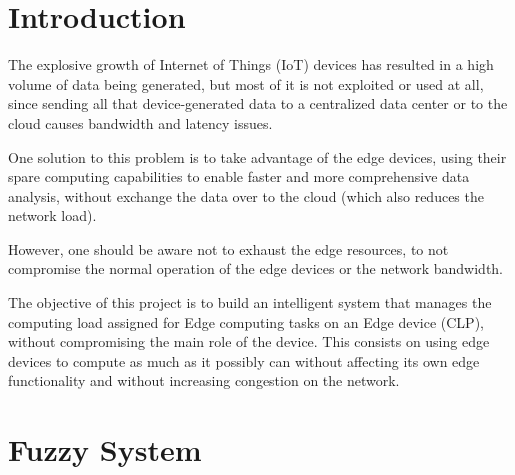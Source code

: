 \documentclass[10pt]{article}
\begin{document}
\maketitle


\section{Introduction}
\normalfont
The explosive growth of Internet of Things (IoT) devices has resulted in a high volume of data being generated, but most of it is not exploited or used at all, since sending all that device-generated data to a centralized data center or to the cloud causes bandwidth and latency issues.

One solution to this problem is to take advantage of the edge devices, using their spare computing capabilities to enable faster and more comprehensive data analysis, without exchange the data over to the cloud (which also reduces the network load).

However, one should be aware not to exhaust the edge resources, to not compromise the normal operation of the edge devices or the network bandwidth.

The objective of this project is to build an intelligent system that manages the computing load assigned for Edge computing tasks on an Edge device (CLP), without compromising the main role of the device. This consists on using edge devices to compute as much as it possibly can without affecting its own edge functionality and without increasing congestion on the network.

\section{Fuzzy System}

\end{document}
